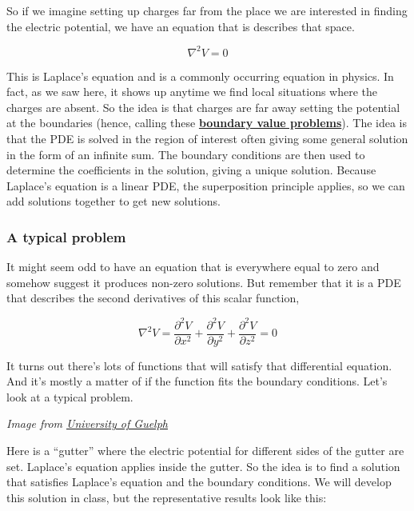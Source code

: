 So if we imagine setting up charges far from the place we are interested
in finding the electric potential, we have an equation that is describes
that space.

\[\nabla^2 V = 0\]

This is Laplace's equation and is a commonly occurring equation in
physics. In fact, as we saw here, it shows up anytime we find local
situations where the charges are absent. So the idea is that charges are
far away setting the potential at the boundaries (hence, calling these
\textbf{\href{https://en.wikipedia.org/wiki/Boundary_value_problem}{boundary
value problems}}). The idea is that the PDE is solved in the region of
interest often giving some general solution in the form of an infinite
sum. The boundary conditions are then used to determine the coefficients
in the solution, giving a unique solution. Because Laplace's equation is
a linear PDE, the superposition principle applies, so we can add
solutions together to get new solutions.

\subsubsection{A typical problem}\label{a-typical-problem}

It might seem odd to have an equation that is everywhere equal to zero
and somehow suggest it produces non-zero solutions. But remember that it
is a PDE that describes the second derivatives of this scalar function,

\[\nabla^2 V = \frac{\partial^2 V}{\partial x^2} + \frac{\partial^2 V}{\partial y^2} + \frac{\partial^2 V}{\partial z^2} = 0\]

It turns out there's lots of functions that will satisfy that
differential equation. And it's mostly a matter of if the function fits
the boundary conditions. Let's look at a typical problem.

\emph{Image from
\href{https://www.physics.uoguelph.ca/chapter-10-laplaces-equation}{University
of Guelph}}

Here is a ``gutter'' where the electric potential for different sides of
the gutter are set. Laplace's equation applies inside the gutter. So the
idea is to find a solution that satisfies Laplace's equation and the
boundary conditions. We will develop this solution in class, but the
representative results look like this:

